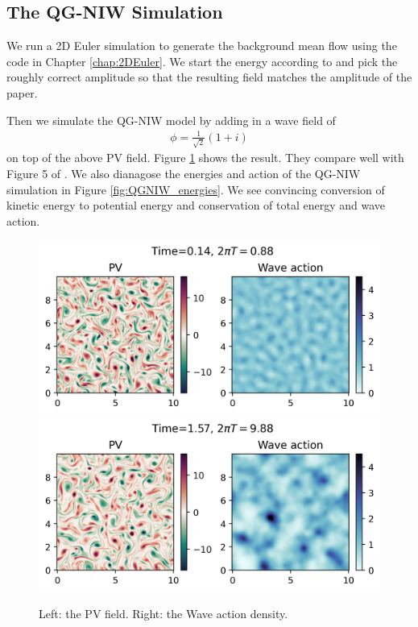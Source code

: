 \subsection{The QG-NIW Simulation}
We run a 2D Euler simulation to generate the background mean flow using the code in Chapter \ref{chap:2DEuler}. We start the energy according to \cite[(4.2)]{RochaEtAl_18} and pick the roughly correct amplitude so that the resulting field matches the amplitude of the \cite{RochaEtAl_18} paper. 

Then we simulate the QG-NIW model by adding in a wave field of
\begin{align}
    \phi = \frac{1}{\sqrt{2}}(1+i)
\end{align}
on top of the above PV field. Figure \ref{fig:QGNIW_fields_t} shows the result. They compare well with Figure 5 of \cite{RochaEtAl_18}. We also dianagose the energies and action of the QG-NIW simulation in Figure \ref{fig:QGNIW_energies}. We see convincing conversion of kinetic energy to potential energy and conservation of total energy and wave action.
\begin{figure}
    \centering
    \includegraphics{QGNIW_fields_t1}
    \includegraphics{QGNIW_fields_t10}
    \caption{Left: the PV field. Right: the Wave action density.}
    \label{fig:QGNIW_fields_t}
\end{figure}

